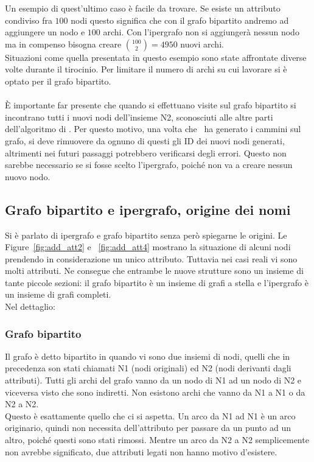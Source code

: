 Un esempio di quest'ultimo caso è facile da trovare. Se esiste un attributo condiviso fra $100$ nodi questo significa che con il grafo bipartito andremo ad aggiungere un nodo e $100$ archi. Con l'ipergrafo non si aggiungerà nessun nodo ma in compenso bisogna creare $ \binom{100}{2} = 4950$ nuovi archi.\\
Situazioni come quella presentata in questo esempio sono state affrontate diverse volte durante il tirocinio. Per limitare il numero di archi su cui lavorare si è optato per il grafo bipartito.\\
\\
È importante far presente che quando si effettuano visite sul grafo bipartito si incontrano tutti i nuovi nodi dell'insieme N2, sconosciuti alle altre parti dell'algoritmo di \cnrl. Per questo motivo, una volta che \nv\ ha generato i cammini sul grafo, si deve rimuovere da ognuno di questi gli ID dei nuovi nodi generati, altrimenti nei futuri passaggi potrebbero verificarsi degli errori. Questo non sarebbe necessario se si fosse scelto l'ipergrafo, poiché non va a creare nessun nuovo nodo.
%
\subsection{Grafo bipartito e ipergrafo, origine dei nomi}
Si è parlato di ipergrafo e grafo bipartito senza però spiegarne le origini. Le Figure~\ref{fig:add_att2} e ~\ref{fig:add_att4} mostrano la situazione di alcuni nodi prendendo in considerazione un unico attributo. Tuttavia nei casi reali vi sono molti attributi. Ne consegue che entrambe le nuove strutture sono un insieme di tante piccole sezioni: il grafo bipartito è un insieme di grafi a stella e l'ipergrafo è un insieme di grafi completi.\\
Nel dettaglio:
%
\subsubsection*{Grafo bipartito}
Il grafo è detto bipartito in quando vi sono due insiemi di nodi, quelli che in precedenza son stati chiamati N1 (nodi originali) ed N2 (nodi derivanti dagli attributi). Tutti gli archi del grafo vanno da un nodo di N1 ad un nodo di N2 e viceversa visto che sono indiretti. Non esistono archi che vanno da N1 a N1 o da N2 a N2.\\
Questo è esattamente quello che ci si aspetta. Un arco da N1 ad N1 è un arco originario, quindi non necessita dell'attributo per passare da un punto ad un altro, poiché questi sono stati rimossi. Mentre un arco da N2 a N2 semplicemente non avrebbe significato, due attributi legati non hanno motivo d'esistere.
%
